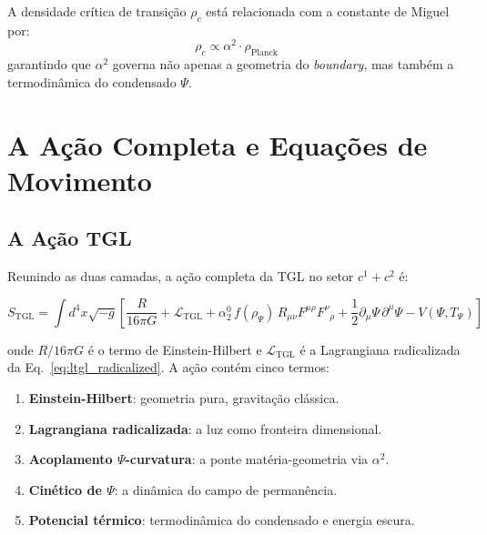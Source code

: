 \documentclass[12pt,a4paper,twoside]{article}
\newcommand{\alphaii}{\alpha^{2}}
\newcommand{\Ltgl}{\mathcal{L}_{\text{TGL}}}
\newcommand{\Psifield}{\Psi}
\newcommand{\boundary}{\textit{boundary}}
\begin{document}
A densidade cr\'itica de transi\c{c}\~ao $\rho_c$ est\'a relacionada com a constante de Miguel por:
\begin{equation}
\rho_c \propto \alphaii \cdot \rho_{\text{Planck}}
\label{eq:critical_density}
\end{equation}
garantindo que $\alphaii$ governa n\~ao apenas a geometria do \boundary, mas tamb\'em a termodin\^amica do condensado $\Psifield$.


\section{A A\c{c}\~ao Completa e Equa\c{c}\~oes de Movimento}


\subsection{A A\c{c}\~ao TGL}

Reunindo as duas camadas, a a\c{c}\~ao completa da TGL no setor $c^1 + c^2$ \'e:

\begin{equationbox}[title={A\c{c}\~ao Completa TGL / Complete TGL Action}]
\begin{equation}
\boxed{S_{\text{TGL}} = \int d^4x \sqrt{-g} \left[\frac{R}{16\pi G} + \Ltgl + \alpha_2^{0}\, f(\rho_\Psifield)\, R_{\mu\nu}F^{\mu\rho}F^{\nu}{}_{\rho} + \frac{1}{2}\partial_\mu\Psifield\,\partial^\mu\Psifield - V(\Psifield, T_\Psifield)\right]}
\label{eq:full_action}
\end{equation}
\end{equationbox}

\noindent onde $R/16\pi G$ \'e o termo de Einstein-Hilbert e $\Ltgl$ \'e a Lagrangiana radicalizada da Eq.~\eqref{eq:ltgl_radicalized}. A a\c{c}\~ao cont\'em cinco termos:

\begin{enumerate}[nosep]
\item \textbf{Einstein-Hilbert}: geometria pura, gravita\c{c}\~ao cl\'assica.
\item \textbf{Lagrangiana radicalizada}: a luz como fronteira dimensional.
\item \textbf{Acoplamento $\Psifield$-curvatura}: a ponte mat\'eria-geometria via $\alphaii$.
\item \textbf{Cin\'etico de $\Psifield$}: a din\^amica do campo de perman\^encia.
\item \textbf{Potencial t\'ermico}: termodin\^amica do condensado e energia escura.
\end{enumerate}
\end{document}
